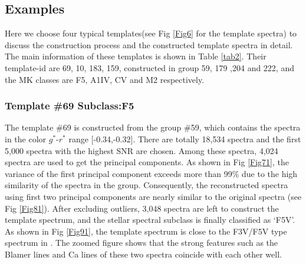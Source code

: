 \documentclass[manuscript]{aastex}
\begin{document}



\subsection{Examples}
Here we choose four typical templates(see Fig \ref{Fig6} for the template spectra)  to  discuss the construction process and the constructed template spectra in detail.
The main information of these templates is shown in Table \ref{tab2}.
Their template-id are 69, 10, 183, 159,
constructed in group 59, 179 ,204 and 222, and
the MK classes are F5, A1IV, CV and M2 respectively.
\subsubsection{Template \#69 Subclass:F5}
\label{sec:conexamples}
The template \#69 is constructed from the group \#59,
which contains the spectra in the color $g^*$-$r^*$ range [-0.34,-0.32].
There are totally 18,534 spectra and the first 5,000 spectra with the highest SNR are chosen.
Among these spectra, 4,024 spectra are used to get the principal components.
As shown in Fig \ref{Fig71},  the variance of the first  principal component  exceeds more than 99\% due to the high similarity of the spectra in the group.
Consequently, the reconstructed spectra using first two  principal components are nearly similar to the original spectra (see Fig \ref{Fig81}).
After excluding outliers, 3,048 spectra are left to construct the template spectrum,
and the stellar spectral subclass is finally classified as `F5V'.
As shown in Fig \ref{Fig91}, the template spectrum is close to the F3V/F5V type spectrum in \cite{bolton2012spectral}.
The zoomed figure shows that the strong features such as  the Blamer lines and  Ca lines of these two spectra coincide
 with each other well.
\end{document}
